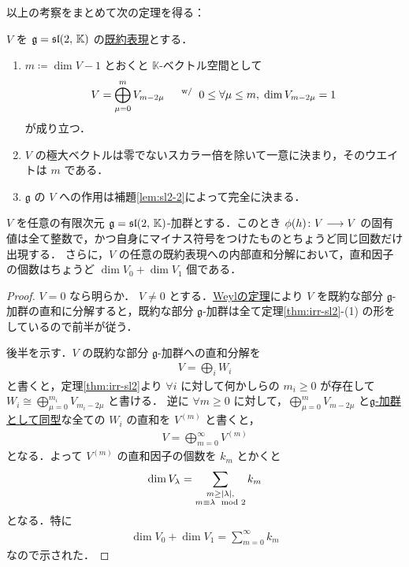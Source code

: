 \documentclass[rep_main]{subfiles}
\begin{document}
以上の考察をまとめて次の定理を得る：

\begin{mytheo}[label=thm:irr-sl2,breakable]{}
	$V$ を $\mathfrak{g} = \mathfrak{sl}(2,\, \mathbb{K})$ の\hyperref[def:irr]{既約表現}とする．
	\begin{enumerate}
		\item $m \coloneqq \dim V - 1$ とおくと $\mathbb{K}$-ベクトル空間として
		\begin{align}
			V = \bigoplus_{\mu = 0}^m V_{m-2\mu}\quad \mathrel{} {}^{\mathrm{w}/} \mathrel{} 0 \le \forall \mu \le m,\; \dim V_{m - 2\mu} = 1
		\end{align}
		が成り立つ．
		\item $V$ の極大ベクトルは零でないスカラー倍を除いて一意に決まり，そのウエイトは $m$ である．
		\item $\mathfrak{g}$ の $V$ への作用は補題\ref{lem:sl2-2}によって完全に決まる．
	\end{enumerate}
\end{mytheo}

\begin{mycol}[label=col:sl2]{}
	$V$ を任意の有限次元 $\mathfrak{g} = \mathfrak{sl}(2,\, \mathbb{K})$-加群とする．このとき $\phi(h) \colon V \longrightarrow V$  の固有値は全て整数で，かつ自身にマイナス符号をつけたものとちょうど同じ回数だけ出現する．
	さらに，$V$ の任意の既約表現への内部直和分解において，直和因子の個数はちょうど $\dim V_0 + \dim V_1$ 個である．
\end{mycol}

\begin{proof}
	$V = 0$ なら明らか．
	$V \neq 0$ とする．\hyperref[thm:Weyl]{Weylの定理}により $V$ を既約な部分 $\mathfrak{g}$-加群の直和に分解すると，既約な部分 $\mathfrak{g}$-加群は全て定理\ref{thm:irr-sl2}-(1) の形をしているので前半が従う．

	後半を示す．$V$ の既約な部分 $\mathfrak{g}$-加群への直和分解を
	\begin{align}
		V = \bigoplus_i W_i
	\end{align}
	と書くと，定理\ref{thm:irr-sl2}より $\forall i$ に対して何かしらの $m_i \ge 0$ が存在して $W_i \cong \bigoplus_{\mu = 0}^{m_i} V_{m_i - 2\mu}$ と書ける．
	逆に $\forall m \ge 0$ に対して，$\bigoplus_{\mu = 0}^{m} V_{m - 2\mu}$ と\hyperref[def:gmod-hom]{$\mathfrak{g}$-加群として同型}な全ての $W_i$ の直和を $V^{(m)}$ と書くと，
	\begin{align}
		V = \bigoplus_{m=0}^\infty V^{(m)}
	\end{align}
	となる．よって $V^{(m)}$ の直和因子の個数を $k_m$ とかくと
	\begin{align}
		\dim V_\lambda = \sum_{\substack{m \ge \abs{\lambda}, \\ m \equiv \lambda \mod 2}} k_m
	\end{align}
	となる．特に
	\begin{align}
		\dim V_0 + \dim V_1 = \sum_{m=0}^\infty k_m
	\end{align}
	なので示された．
\end{proof}
\end{document}

